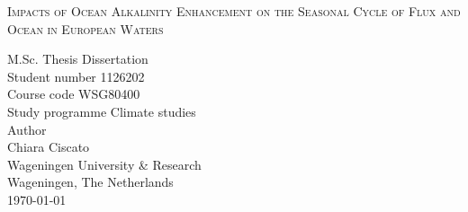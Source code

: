 \begin{titlepage}
\centering
\vspace*{\fill}
\begin{Large}\bfseries

\textsc{Impacts of Ocean Alkalinity Enhancement on the Seasonal Cycle of  Flux and Ocean  in European Waters}

\end{Large}
\vspace{3cm}

\begin{center}%
M.Sc. Thesis Dissertation \\ \vspace{0.25cm}
Student number 1126202 \\ \vspace{0.25cm}
Course code WSG80400 \\ \vspace{0.25cm}
Study programme Climate studies \\ \vspace{0.25cm}
\vspace{2.5cm} 
Author \\\vspace{0.15cm}
\vspace{0.15cm} 
Chiara Ciscato \\ \vspace{0.25cm}
\vspace{1cm} 
\vspace*{\fill}
Wageningen University \& Research \\ \vspace{0.25cm}
Wageningen, The Netherlands \\ \vspace{0.25cm}
\today \\ \vspace{0.25cm}
\end{center}
\end{titlepage}